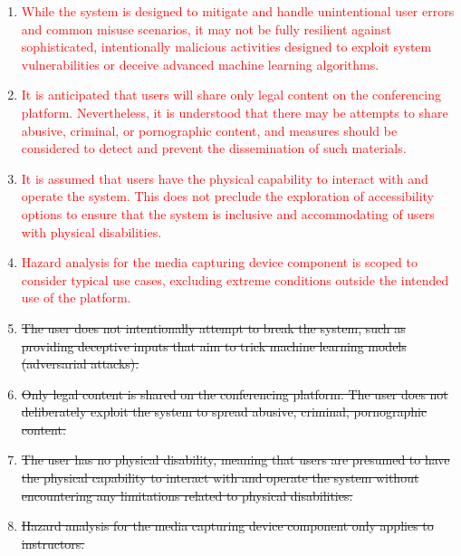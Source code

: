 \documentclass{article}
\begin{document}
\begin{enumerate}
\item \textcolor{red}{While the system is designed to mitigate and handle unintentional 
  user errors and common misuse scenarios, it may not be fully resilient against 
  sophisticated, intentionally malicious activities designed to exploit system 
  vulnerabilities or deceive advanced machine learning algorithms.}
\item \textcolor{red}{It is anticipated that users will share only legal content on 
the conferencing platform. Nevertheless, it is understood that there may be attempts 
to share abusive, criminal, or pornographic content, and measures should be considered 
to detect and prevent the dissemination of such materials.}
\item \textcolor{red}{It is assumed that users have the physical capability to interact 
with and operate the system. This does not preclude the exploration of accessibility 
options to ensure that the system is inclusive and accommodating of users with physical 
disabilities.}
\item \textcolor{red}{Hazard analysis for the media capturing device component is 
scoped to consider typical use cases, excluding extreme conditions outside the intended 
use of the platform.}
\item \sout{The user does not intentionally attempt to break the system, such as
providing deceptive inputs that aim to trick machine learning models
(adversarial attacks).}
\item \sout{Only legal content is shared on the conferencing platform. The user does not
  deliberately exploit the system to spread abusive, criminal, pornographic
  content.}
\item \sout{The user has no physical disability, meaning that users are presumed to have
  the physical capability to interact with and operate the system without
  encountering any limitations related to physical disabilities.}
\item \sout{Hazard analysis for the media capturing device component only applies to
  instructors.}
\end{enumerate}
\end{document}

